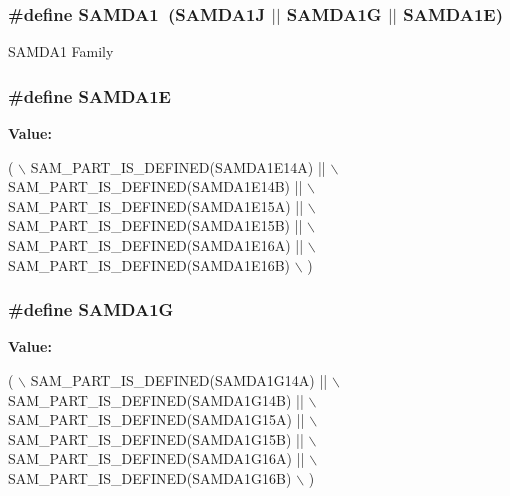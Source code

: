 \subsubsection[{S\+A\+M\+D\+A1}]{\setlength{\rightskip}{0pt plus 5cm}\#define S\+A\+M\+D\+A1~(S\+A\+M\+D\+A1\+J $\vert$$\vert$ S\+A\+M\+D\+A1\+G $\vert$$\vert$ S\+A\+M\+D\+A1\+E)}\label{group__sam__part__macros__group_ga072dd622eab25246a14ce4a97a3df2df}
S\+A\+M\+D\+A1 Family \hypertarget{group__sam__part__macros__group_gab3c006df6e9b5866427a0df88b253351}{}
\subsubsection[{S\+A\+M\+D\+A1\+E}]{\setlength{\rightskip}{0pt plus 5cm}\#define S\+A\+M\+D\+A1\+E}\label{group__sam__part__macros__group_gab3c006df6e9b5866427a0df88b253351}
{\bfseries Value\+:}
\begin{DoxyCode}
( \(\backslash\)
        SAM\_PART\_IS\_DEFINED(SAMDA1E14A) || \(\backslash\)
        SAM\_PART\_IS\_DEFINED(SAMDA1E14B) || \(\backslash\)
        SAM\_PART\_IS\_DEFINED(SAMDA1E15A) || \(\backslash\)
        SAM\_PART\_IS\_DEFINED(SAMDA1E15B) || \(\backslash\)
        SAM\_PART\_IS\_DEFINED(SAMDA1E16A) || \(\backslash\)
        SAM\_PART\_IS\_DEFINED(SAMDA1E16B) \(\backslash\)
    )
\end{DoxyCode}
\hypertarget{group__sam__part__macros__group_ga50dbce5f439ee5e0228cfd1982793627}{}
\subsubsection[{S\+A\+M\+D\+A1\+G}]{\setlength{\rightskip}{0pt plus 5cm}\#define S\+A\+M\+D\+A1\+G}\label{group__sam__part__macros__group_ga50dbce5f439ee5e0228cfd1982793627}
{\bfseries Value\+:}
\begin{DoxyCode}
( \(\backslash\)
        SAM\_PART\_IS\_DEFINED(SAMDA1G14A) || \(\backslash\)
        SAM\_PART\_IS\_DEFINED(SAMDA1G14B) || \(\backslash\)
        SAM\_PART\_IS\_DEFINED(SAMDA1G15A) || \(\backslash\)
        SAM\_PART\_IS\_DEFINED(SAMDA1G15B) || \(\backslash\)
        SAM\_PART\_IS\_DEFINED(SAMDA1G16A) || \(\backslash\)
        SAM\_PART\_IS\_DEFINED(SAMDA1G16B) \(\backslash\)
    )
\end{DoxyCode}
\hypertarget{group__sam__part__macros__group_gac5ecd62910ae8097510c6b9be6fdc422}{}

